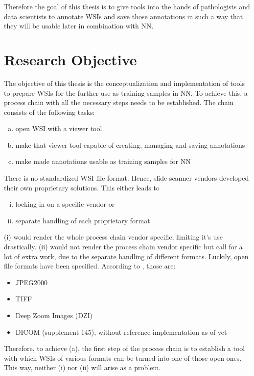 Therefore the goal of this thesis is to give tools into the hands of pathologists and data scientists to annotate WSIs and save those annotations in such a way that they will be usable later in combination with NN.


\section{Research Objective}
The objective of this thesis is the conceptualization and implementation of tools to prepare WSIs for the further use as training samples in NN. To achieve this, a process chain with all the necessary steps needs to be established. The chain consists of the following tasks:
\begin{enumerate}[(a)]
	\item open WSI with a viewer tool
	\item make that viewer tool capable of creating, managing and saving annotations
	\item make made annotations usable as training samples for NN
\end{enumerate}

There is no standardized WSI file format. Hence, slide scanner vendors developed their own proprietary solutions. This either leads to
\begin{enumerate}[(i)]
	\item locking-in on a specific vendor or
	\item separate handling of each proprietary format
\end{enumerate}
(i) would render the whole process chain vendor specific, limiting it's use drastically. (ii) would not render the process chain vendor specific but call for a lot of extra work, due to the separate handling of different formats. Luckily, open file formats have been specified. According to \cite{Cornish13}, those are:
\begin{itemize}
	\item JPEG2000
	\item TIFF
	\item Deep Zoom Images (DZI)
	\item DICOM (supplement 145), without reference implementation as of yet\cite{Cornish13}
\end{itemize}
Therefore, to achieve (a), the first step of the process chain is to establish a tool with which WSIs of various formats can be turned into one of those open ones. This way, neither (i) nor (ii) will arise as a problem.

